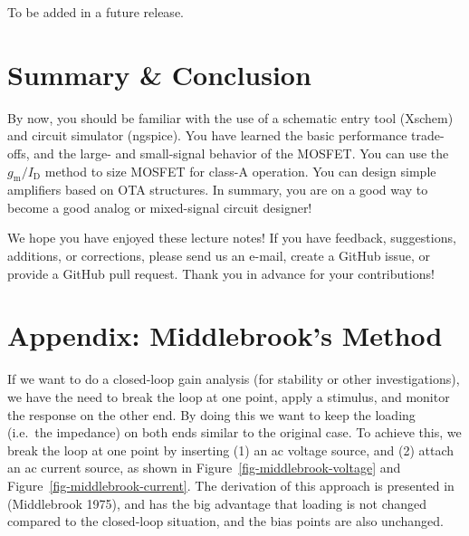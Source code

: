 \documentclass[
  a4paper,
  DIV=11,
  numbers=noendperiod]{scrartcl}
\begin{document}
To be added in a future release.

\section{Summary \& Conclusion}\label{summary-conclusion}

By now, you should be familiar with the use of a schematic entry tool
(Xschem) and circuit simulator (ngspice). You have learned the basic
performance trade-offs, and the large- and small-signal behavior of the
MOSFET. You can use the \(g_\mathrm{m}/I_\mathrm{D}\) method to size
MOSFET for class-A operation. You can design simple amplifiers based on
OTA structures. In summary, you are on a good way to become a good
analog or mixed-signal circuit designer!

\begin{tcolorbox}[enhanced jigsaw, toprule=.15mm, titlerule=0mm, left=2mm, leftrule=.75mm, toptitle=1mm, breakable, colframe=quarto-callout-important-color-frame, colback=white, colbacktitle=quarto-callout-important-color!10!white, opacityback=0, arc=.35mm, coltitle=black, bottomtitle=1mm, title=\textcolor{quarto-callout-important-color}{\faExclamation}\hspace{0.5em}{Feedback}, bottomrule=.15mm, rightrule=.15mm, opacitybacktitle=0.6]

We hope you have enjoyed these lecture notes! If you have feedback,
suggestions, additions, or corrections, please send us an e-mail, create
a GitHub issue, or provide a GitHub pull request. Thank you in advance
for your contributions!

\end{tcolorbox}

\section{Appendix: Middlebrook's Method}\label{sec-middlebrook-method}

If we want to do a closed-loop gain analysis (for stability or other
investigations), we have the need to break the loop at one point, apply
a stimulus, and monitor the response on the other end. By doing this we
want to keep the loading (i.e.~the impedance) on both ends similar to
the original case. To achieve this, we break the loop at one point by
inserting (1) an ac voltage source, and (2) attach an ac current source,
as shown in Figure~\ref{fig-middlebrook-voltage} and
Figure~\ref{fig-middlebrook-current}. The derivation of this approach is
presented in (Middlebrook 1975), and has the big advantage that loading
is not changed compared to the closed-loop situation, and the bias
points are also unchanged.
\end{document}
